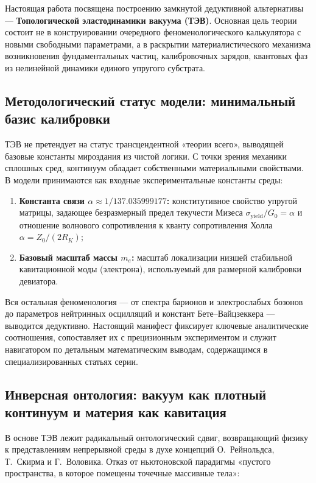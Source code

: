 \documentclass[11pt,a4paper]{article}
\theoremstyle{definition}
\theoremstyle{remark}
\begin{document}
Настоящая работа посвящена построению замкнутой дедуктивной альтернативы — \textbf{Топологической эластодинамики вакуума (ТЭВ)}. Основная цель теории состоит не в конструировании очередного феноменологического калькулятора с новыми свободными параметрами, а в раскрытии материалистического механизма возникновения фундаментальных частиц, калибровочных зарядов, квантовых фаз из нелинейной динамики единого упругого субстрата.

\subsection{Методологический статус модели: минимальный базис калибровки}
ТЭВ не претендует на статус трансцендентной «теории всего», выводящей базовые константы мироздания из чистой логики. С точки зрения механики сплошных сред, континуум обладает собственными материальными свойствами. В модели принимаются как входные экспериментальные константы среды:
\begin{enumerate}
    \item \textbf{Константа связи $\alpha \approx 1/137.035999177$:} конститутивное свойство упругой матрицы, задающее безразмерный предел текучести Мизеса $\sigma_{\mathrm{yield}}/G_0 = \alpha$ и отношение волнового сопротивления к кванту сопротивления Холла $\alpha = Z_0 / (2 R_K)$;
   \item \textbf{Базовый масштаб массы $m_e$:} масштаб локализации низшей стабильной кавитационной моды (электрона), используемый для размерной калибровки девиатора.
\end{enumerate}
Вся остальная феноменология — от спектра барионов и электрослабых бозонов до параметров нейтринных осцилляций и констант Бете--Вайцзеккера — выводится дедуктивно. Настоящий манифест фиксирует ключевые аналитические соотношения, сопоставляет их с прецизионным экспериментом и служит навигатором по детальным математическим выводам, содержащимся в специализированных статьях серии.

\subsection{Инверсная онтология: вакуум как плотный континуум и материя как кавитация}
В основе ТЭВ лежит радикальный онтологический сдвиг, возвращающий физику к представлениям непрерывной среды в духе концепций О.~Рейнольдса, Т.~Скирма и Г.~Воловика. Отказ от ньютоновской парадигмы «пустого пространства, в которое помещены точечные массивные тела»:
\end{document}
